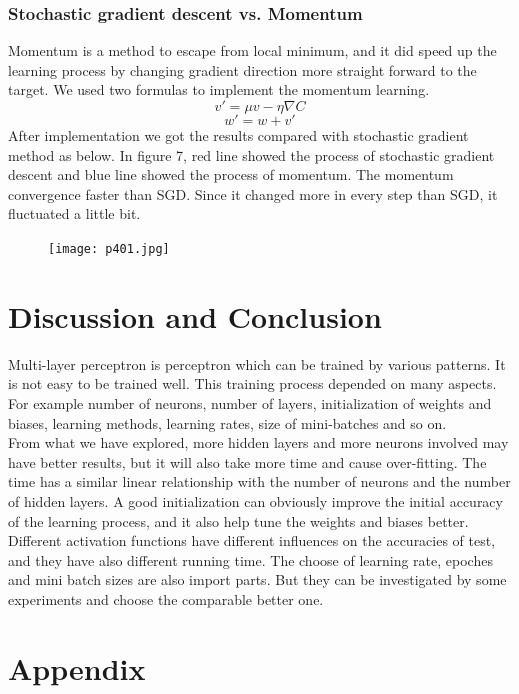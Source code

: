 \documentclass[12pt,a4paper]{article}
\begin{document}
\subsubsection{Stochastic gradient descent vs. Momentum}
Momentum is a method to escape from local minimum, and it did speed up the learning process by changing gradient direction more straight forward to the target. We used two formulas to implement the momentum learning.
\[v' = \mu v - \eta \nabla C\]
\[w' = w + v'\]
After implementation we got the results compared with stochastic gradient method as below. In figure 7, red line showed the process of stochastic gradient descent and blue line showed the process of momentum. The momentum convergence faster than SGD. Since it changed more in every step than SGD, it fluctuated a little bit. \\
\begin{figure}
\centering
\texttt{[image: p401.jpg]}\\
\end{figure}

\section{Discussion and Conclusion}
Multi-layer perceptron is perceptron which can be trained by various patterns. It is not easy to be trained well. This training process depended on many aspects. For example number of neurons, number of layers, initialization of weights and biases, learning methods, learning rates, size of mini-batches and so on. \\

From what we have explored, more hidden layers and more neurons involved may have better results, but it will also take more time and cause over-fitting. The time has a similar linear relationship with the number of neurons and the number of hidden layers. A good initialization can obviously improve the initial accuracy of the learning process, and it also help tune the weights and biases better. Different activation functions have different influences on the accuracies of test, and they have also different running time. The choose of learning rate, epoches and mini batch sizes are also import parts. But they can be investigated by some experiments and choose the comparable better one.

\newpage
\section{Appendix}
\end{document}
